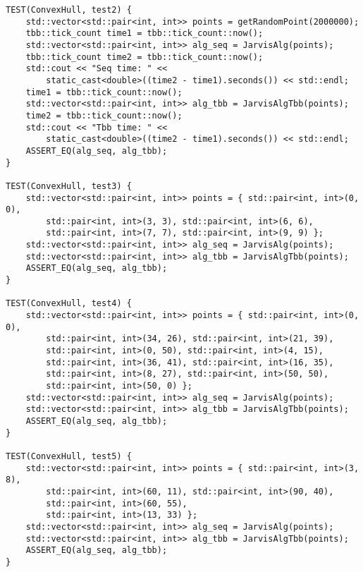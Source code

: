 \documentclass{report}
\begin{document}
\begin{lstlisting}
TEST(ConvexHull, test2) {
    std::vector<std::pair<int, int>> points = getRandomPoint(2000000);
    tbb::tick_count time1 = tbb::tick_count::now();
    std::vector<std::pair<int, int>> alg_seq = JarvisAlg(points);
    tbb::tick_count time2 = tbb::tick_count::now();
    std::cout << "Seq time: " <<
        static_cast<double>((time2 - time1).seconds()) << std::endl;
    time1 = tbb::tick_count::now();
    std::vector<std::pair<int, int>> alg_tbb = JarvisAlgTbb(points);
    time2 = tbb::tick_count::now();
    std::cout << "Tbb time: " <<
        static_cast<double>((time2 - time1).seconds()) << std::endl;
    ASSERT_EQ(alg_seq, alg_tbb);
}

TEST(ConvexHull, test3) {
    std::vector<std::pair<int, int>> points = { std::pair<int, int>(0, 0),
        std::pair<int, int>(3, 3), std::pair<int, int>(6, 6),
        std::pair<int, int>(7, 7), std::pair<int, int>(9, 9) };
    std::vector<std::pair<int, int>> alg_seq = JarvisAlg(points);
    std::vector<std::pair<int, int>> alg_tbb = JarvisAlgTbb(points);
    ASSERT_EQ(alg_seq, alg_tbb);
}

TEST(ConvexHull, test4) {
    std::vector<std::pair<int, int>> points = { std::pair<int, int>(0, 0),
        std::pair<int, int>(34, 26), std::pair<int, int>(21, 39),
        std::pair<int, int>(0, 50), std::pair<int, int>(4, 15),
        std::pair<int, int>(36, 41), std::pair<int, int>(16, 35),
        std::pair<int, int>(8, 27), std::pair<int, int>(50, 50),
        std::pair<int, int>(50, 0) };
    std::vector<std::pair<int, int>> alg_seq = JarvisAlg(points);
    std::vector<std::pair<int, int>> alg_tbb = JarvisAlgTbb(points);
    ASSERT_EQ(alg_seq, alg_tbb);
}

TEST(ConvexHull, test5) {
    std::vector<std::pair<int, int>> points = { std::pair<int, int>(3, 8),
        std::pair<int, int>(60, 11), std::pair<int, int>(90, 40),
        std::pair<int, int>(60, 55),
        std::pair<int, int>(13, 33) };
    std::vector<std::pair<int, int>> alg_seq = JarvisAlg(points);
    std::vector<std::pair<int, int>> alg_tbb = JarvisAlgTbb(points);
    ASSERT_EQ(alg_seq, alg_tbb);
}
\end{lstlisting}
\end{document}
